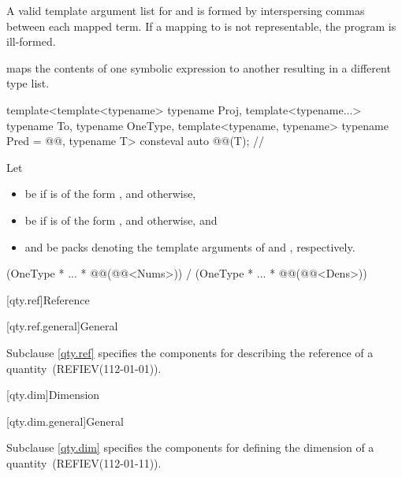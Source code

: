 \begin{itemdescr}
\pnum
\remarks
A valid template argument list for  and 
is formed by interspersing commas between each mapped term.
If a mapping to  is not representable,
the program is ill-formed.
\end{itemdescr}

\pnum
{} maps the contents of one symbolic expression to another resulting in a different type list.

\begin{itemdecl}
template<template<typename> typename Proj, template<typename...> typename To, typename OneType,
         template<typename, typename> typename Pred = @@, typename T>
consteval auto @@(T);  // \expos
\end{itemdecl}

\begin{itemdescr}
\pnum
Let
\begin{itemize}
\item
{} be
 if  is of the form , and
 otherwise,
\item
{} be
 if  is of the form , and
 otherwise, and
\item
{} and 
be packs denoting the template arguments of
 and , respectively.
\end{itemize}

\pnum
\returns
\begin{codeblock}
(OneType{} * ... * @@(@@<Nums>{})) /
(OneType{} * ... * @@(@@<Dens>{}))
\end{codeblock}
\end{itemdescr}

[qty.ref]{Reference}

[qty.ref.general]{General}

\pnum
Subclause \ref{qty.ref} specifies the components
for describing the reference of a quantity~(REFIEV(112-01-01)).

[qty.dim]{Dimension}

[qty.dim.general]{General}

\pnum
Subclause \ref{qty.dim} specifies the components
for defining the dimension of a quantity~(REFIEV(112-01-11)).

